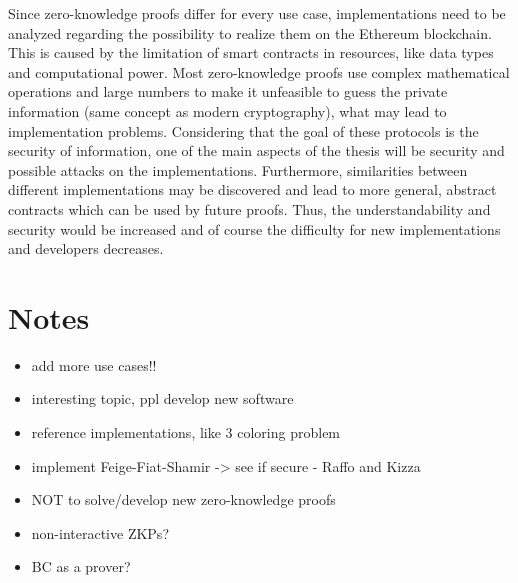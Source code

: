 \documentclass[a4paper,parskip=half]{scrartcl}
\begin{document}
Since zero-knowledge proofs differ for every use case, implementations need to be analyzed regarding the possibility to realize them on the Ethereum blockchain.
This is caused by the limitation of smart contracts in resources, like data types and computational power.
Most zero-knowledge proofs use complex mathematical operations and large numbers to make it unfeasible to guess the private information (same concept as modern cryptography), what may lead to implementation problems.
Considering that the goal of these protocols is the security of information, one of the main aspects of the thesis will be security and possible attacks on the implementations.
Furthermore, similarities between different implementations may be discovered and lead to more general, abstract contracts which can be used by future proofs.
Thus, the understandability and security would be increased and of course the difficulty for new implementations and developers decreases.

\section*{Notes}
\begin{itemize}
	\item add more use cases!!
	\item interesting topic, ppl develop new software
	\item reference implementations, like 3 coloring problem
	\item implement Feige-Fiat-Shamir \cite{feige1988zero} -> see if secure - Raffo and Kizza \cite{raffo2002digital, kizza2010feige}
	\item NOT to solve/develop new zero-knowledge proofs
	\item non-interactive ZKPs?
	\item BC as a prover?
\end{itemize}



\end{document}
